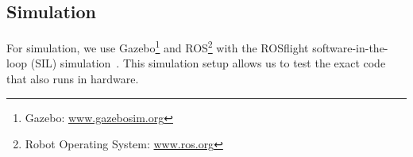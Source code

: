 
\subsection{Simulation}

For simulation, we use Gazebo\footnote{Gazebo:
\url{www.gazebosim.org}}
and ROS\footnote{Robot Operating System:
\url{www.ros.org}}
with the ROSflight software-in-the-loop
(SIL) simulation~\cite{jackson2016rosflight}. This simulation setup allows us to test
the exact code that also runs in hardware.



